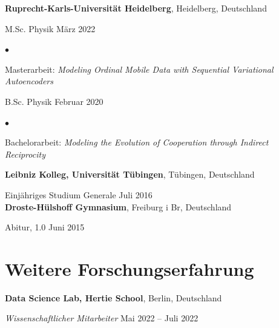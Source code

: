 \documentclass[margin,line, 10pt]{res}
\newenvironment{list2}{
	\begin{list}{$\bullet$}{%
			\setlength{\itemsep}{0in}
			\setlength{\parsep}{0in} \setlength{\parskip}{0in}
			\setlength{\topsep}{0in} \setlength{\partopsep}{0in} 
			\setlength{\leftmargin}{0.2in}}}{\end{list}}
\begin{document}
\begin{resume}
		{\bf Ruprecht-Karls-Universit\"at Heidelberg}, Heidelberg, Deutschland
		
		\vspace{-0.4cm}
		M.Sc. Physik \hfill {M\"arz 2022}\\
		
		\begin{list2}
			\vspace*{-0.3cm}
			\item Masterarbeit: \emph{Modeling Ordinal Mobile Data with Sequential Variational Autoencoders}
		\end{list2}
		
		\vspace{-0.3cm}
		B.Sc. Physik \hfill {Februar 2020} \\
		
		\begin{list2}
			\vspace*{-0.4cm}
			\item Bachelorarbeit: \emph{Modeling the Evolution of Cooperation through Indirect Reciprocity}
		\end{list2}
		
		{\bf Leibniz Kolleg, Universit\"at T\"ubingen}, T\"ubingen, Deutschland
		
		\vspace{-0.4cm}
		Einjähriges Studium Generale \hfill {Juli 2016}\\
		
		\vspace{-0.5cm}
		{\bf Droste-Hülshoff Gymnasium}, Freiburg i Br, Deutschland
		
		\vspace{-0.4cm}
		Abitur, 1.0 \hfill {Juni 2015}\\
		
		
		
		
		\section{\sc Weitere Forschungs\-erfahrung}
		
		{\bf Data Science Lab, Hertie School}, Berlin, Deutschland
		
		\vspace{-.3cm}
		{\em Wissenschaftlicher Mitarbeiter} \hfill {Mai 2022 -- Juli 2022}\\
		

\end{resume}
\end{document}
